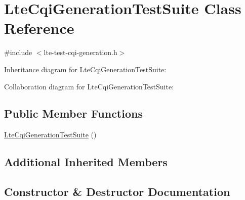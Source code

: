 \hypertarget{classLteCqiGenerationTestSuite}{}\section{Lte\+Cqi\+Generation\+Test\+Suite Class Reference}
\label{classLteCqiGenerationTestSuite}


{\ttfamily \#include $<$lte-\/test-\/cqi-\/generation.\+h$>$}



Inheritance diagram for Lte\+Cqi\+Generation\+Test\+Suite\+:


Collaboration diagram for Lte\+Cqi\+Generation\+Test\+Suite\+:
\subsection*{Public Member Functions}
\begin{DoxyCompactItemize}
\item 
\hyperlink{classLteCqiGenerationTestSuite_aaf79a1ab65fb75afec12aca33e0e4331}{Lte\+Cqi\+Generation\+Test\+Suite} ()
\end{DoxyCompactItemize}
\subsection*{Additional Inherited Members}


\subsection{Constructor \& Destructor Documentation}
